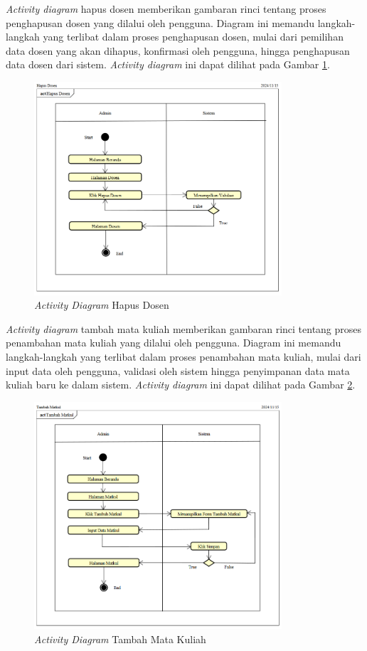 \textit{Activity diagram} hapus dosen memberikan gambaran rinci tentang proses penghapusan dosen yang dilalui oleh pengguna. Diagram ini memandu langkah-langkah yang terlibat dalam proses penghapusan dosen, mulai dari pemilihan data dosen yang akan dihapus, konfirmasi oleh pengguna, hingga penghapusan data dosen dari sistem. \textit{Activity diagram} ini dapat dilihat pada Gambar \ref{activity-diagram-hapus-dosen}.
\begin{figure}
	\centering
	\includegraphics[width=0.82\textwidth]{konten/gambar/activity-diagram/hapus-dosen.png}
	\caption{\textit{Activity Diagram} Hapus Dosen}
	\label{activity-diagram-hapus-dosen}
\end{figure}

\textit{Activity diagram} tambah mata kuliah memberikan gambaran rinci tentang proses penambahan mata kuliah yang dilalui oleh pengguna. Diagram ini memandu langkah-langkah yang terlibat dalam proses penambahan mata kuliah, mulai dari input data oleh pengguna, validasi oleh sistem hingga penyimpanan data mata kuliah baru ke dalam sistem. \textit{Activity diagram} ini dapat dilihat pada Gambar \ref{activity-diagram-tambah-matkul}.
\begin{figure}
	\centering
	\includegraphics[width=0.82\textwidth]{konten/gambar/activity-diagram/tambah-matkul.png}
	\caption{\textit{Activity Diagram} Tambah Mata Kuliah}
	\label{activity-diagram-tambah-matkul}
\end{figure}

